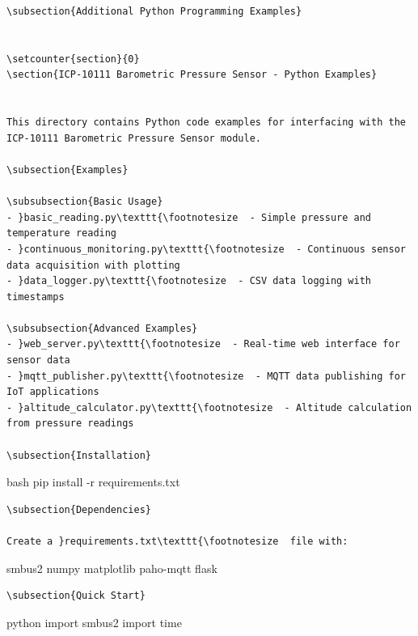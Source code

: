 \documentclass[11pt,a4paper]{article}
\begin{document}
\begin{lstlisting}[language=text]
\subsection{Additional Python Programming Examples}


\setcounter{section}{0}
\section{ICP-10111 Barometric Pressure Sensor - Python Examples}


This directory contains Python code examples for interfacing with the ICP-10111 Barometric Pressure Sensor module.

\subsection{Examples}

\subsubsection{Basic Usage}
- }basic_reading.py\texttt{\footnotesize  - Simple pressure and temperature reading
- }continuous_monitoring.py\texttt{\footnotesize  - Continuous sensor data acquisition with plotting
- }data_logger.py\texttt{\footnotesize  - CSV data logging with timestamps

\subsubsection{Advanced Examples}
- }web_server.py\texttt{\footnotesize  - Real-time web interface for sensor data
- }mqtt_publisher.py\texttt{\footnotesize  - MQTT data publishing for IoT applications
- }altitude_calculator.py\texttt{\footnotesize  - Altitude calculation from pressure readings

\subsection{Installation}
\end{lstlisting}bash
pip install -r requirements.txt
\begin{lstlisting}[language=text]
\subsection{Dependencies}

Create a }requirements.txt\texttt{\footnotesize  file with:
\end{lstlisting}
smbus2
numpy
matplotlib
paho-mqtt
flask
\begin{lstlisting}[language=text]
\subsection{Quick Start}
\end{lstlisting}python
import smbus2
import time
\end{document}

